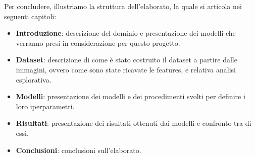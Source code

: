 Per concludere, illustriamo la struttura dell'elaborato, la quale si articola
nei seguenti capitoli:
\begin{itemize}
      \item \textbf{Introduzione}: descrizione del dominio e presentazione dei
            modelli che verranno presi in considerazione per questo progetto.
      \item \textbf{Dataset}: descrizione di come è stato costruito il dataset a
            partire dalle immagini, ovvero come sono state ricavate le features,
            e relativa analisi esplorativa.
      \item \textbf{Modelli}: presentazione dei modelli e dei procedimenti svolti
            per definire i loro iperparametri.
      \item \textbf{Risultati}: presentazione dei risultati ottenuti dai modelli
            e confronto tra di essi.
      \item \textbf{Conclusioni}: conclusioni sull'elaborato.
\end{itemize}